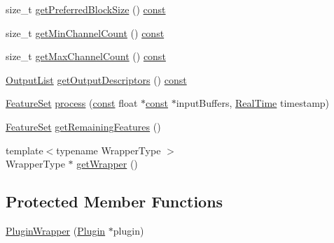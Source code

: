 \begin{DoxyCompactItemize}
\item 
size\+\_\+t \hyperlink{class_vamp_1_1_host_ext_1_1_plugin_wrapper_a2c62a656313a819650656643a867ad01}{get\+Preferred\+Block\+Size} () \hyperlink{getopt1_8c_a2c212835823e3c54a8ab6d95c652660e}{const} 
\item 
size\+\_\+t \hyperlink{class_vamp_1_1_host_ext_1_1_plugin_wrapper_a2b28f1cf37d46a514f1e1411a6037bf8}{get\+Min\+Channel\+Count} () \hyperlink{getopt1_8c_a2c212835823e3c54a8ab6d95c652660e}{const} 
\item 
size\+\_\+t \hyperlink{class_vamp_1_1_host_ext_1_1_plugin_wrapper_a985eb21f1827bfbc3950d6871b107a58}{get\+Max\+Channel\+Count} () \hyperlink{getopt1_8c_a2c212835823e3c54a8ab6d95c652660e}{const} 
\item 
\hyperlink{class_vamp_1_1_plugin_a30f531b8fb69fac41a24e3d2a6a08ed9}{Output\+List} \hyperlink{class_vamp_1_1_host_ext_1_1_plugin_wrapper_a02c8c01972affeea58b091335e791ace}{get\+Output\+Descriptors} () \hyperlink{getopt1_8c_a2c212835823e3c54a8ab6d95c652660e}{const} 
\item 
\hyperlink{class_vamp_1_1_plugin_a448fb57dc245d47923ec9eeaf9856c5f}{Feature\+Set} \hyperlink{class_vamp_1_1_host_ext_1_1_plugin_wrapper_afca78043c2843c1d45019983515e23f7}{process} (\hyperlink{getopt1_8c_a2c212835823e3c54a8ab6d95c652660e}{const} float $\ast$\hyperlink{getopt1_8c_a2c212835823e3c54a8ab6d95c652660e}{const} $\ast$input\+Buffers, \hyperlink{struct_vamp_1_1_real_time}{Real\+Time} timestamp)
\item 
\hyperlink{class_vamp_1_1_plugin_a448fb57dc245d47923ec9eeaf9856c5f}{Feature\+Set} \hyperlink{class_vamp_1_1_host_ext_1_1_plugin_wrapper_a1dce55a75a32b08fc56a52a300d9fcbe}{get\+Remaining\+Features} ()
\item 
{\footnotesize template$<$typename Wrapper\+Type $>$ }\\Wrapper\+Type $\ast$ \hyperlink{class_vamp_1_1_host_ext_1_1_plugin_wrapper_a653d0308e8e34881a8749b7631d00f05}{get\+Wrapper} ()
\end{DoxyCompactItemize}
\subsection*{Protected Member Functions}
\begin{DoxyCompactItemize}
\item 
\hyperlink{class_vamp_1_1_host_ext_1_1_plugin_wrapper_a35cc2d42f8322f5022e89859a79c97be}{Plugin\+Wrapper} (\hyperlink{class_vamp_1_1_plugin}{Plugin} $\ast$plugin)
\end{DoxyCompactItemize}
